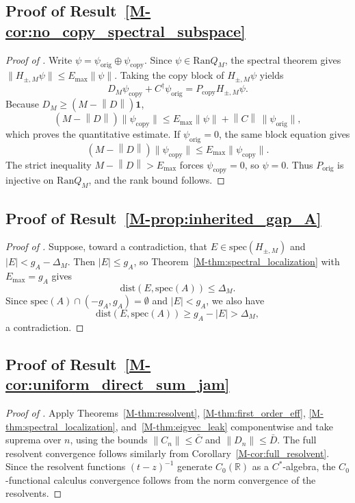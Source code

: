 \documentclass[11pt]{article}
\numberwithin{equation}{section}
\theoremstyle{definition}
\theoremstyle{remark}
\newcommand{\Id}{\mathbf{1}}
\newcommand{\spec}{\mathrm{spec}}
\newcommand{\dist}{\mathrm{dist}}
\newcommand{\Ran}{\mathrm{Ran}}
\newcommand{\opnorm}[1]{\left\lVert#1\right\rVert}
\begin{document}
\subsection{Proof of Result~\ref{M-cor:no_copy_spectral_subspace}}\label{app:proof:cor:no_copy_spectral_subspace}
\begin{proof}[Proof of ]
Write \(\psi=\psi_{\mathrm{orig}}\oplus\psi_{\mathrm{copy}}\). Since
\(\psi\in\Ran Q_M\), the spectral theorem gives \(\|H_{\pm,M}\psi\|\le E_{\max}\|\psi\|\).
Taking the copy block of \(H_{\pm,M}\psi\) yields
\[
D_M\psi_{\mathrm{copy}}+C^\dagger\psi_{\mathrm{orig}}
=P_{\mathrm{copy}}H_{\pm,M}\psi .
\]
Because \(D_M\ge (M-\opnorm D)\Id\),
\[
(M-\opnorm D)\|\psi_{\mathrm{copy}}\|
\le E_{\max}\|\psi\|+\opnorm C\,\|\psi_{\mathrm{orig}}\|,
\]
which proves the quantitative estimate. If \(\psi_{\mathrm{orig}}=0\), the same block equation
gives
\[
(M-\opnorm D)\|\psi_{\mathrm{copy}}\|\le E_{\max}\|\psi_{\mathrm{copy}}\|.
\]
The strict inequality \(M-\opnorm D>E_{\max}\) forces \(\psi_{\mathrm{copy}}=0\), so
\(\psi=0\). Thus \(P_{\mathrm{orig}}\) is injective on \(\Ran Q_M\), and the rank bound follows.
\end{proof}

\subsection{Proof of Result~\ref{M-prop:inherited_gap_A}}\label{app:proof:prop:inherited_gap_A}
\begin{proof}[Proof of ]
Suppose, toward a contradiction, that $E\in\spec(H_{\pm,M})$ and
$|E|<g_A-\Delta_M$. Then $|E|\le g_A$, so Theorem~\ref{M-thm:spectral_localization} with
$E_{\max}=g_A$ gives
\[
\dist(E,\spec(A))\le \Delta_M.
\]
Since $\spec(A)\cap(-g_A,g_A)=\emptyset$ and $|E|<g_A$, we also have
\[
\dist(E,\spec(A))\ge g_A-|E|>\Delta_M,
\]
a contradiction.
\end{proof}

\subsection{Proof of Result~\ref{M-cor:uniform_direct_sum_jam}}\label{app:proof:cor:uniform_direct_sum_jam}
\begin{proof}[Proof of ]
Apply Theorems~\ref{M-thm:resolvent}, \ref{M-thm:first_order_eff},
\ref{M-thm:spectral_localization}, and~\ref{M-thm:eigvec_leak} componentwise and take suprema over
\(n\), using the bounds \(\|C_n\|\le\bar C\) and \(\|D_n\|\le\bar D\). The full resolvent
convergence follows similarly from Corollary~\ref{M-cor:full_resolvent}. Since the resolvent
functions \((t-z)^{-1}\) generate \(C_0(\mathbb R)\) as a \(C^*\)-algebra, the \(C_0\)-functional
calculus convergence follows from the norm convergence of the resolvents.
\end{proof}
\end{document}
